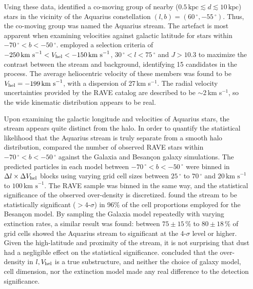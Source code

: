 \documentclass{emulateapj}
\begin{document}
Using these data, \citet{williams;et-al_2011} identified a co-moving group of nearby ($0.5\,\mbox{kpc} \lesssim d \lesssim 10\,\mbox{kpc}$) stars in the vicinity of the Aquarius constellation $(l, b) = (60\,^\circ, -55\,^\circ)$. Thus, the co-moving group was named the Aquarius stream. The artefact is most apparent when examining velocities against galactic latitude for stars within $-70\,^\circ < b < -50\,^\circ$. \citet{williams;et-al_2011} employed a selection criteria of $-250\,\mbox{km s}^{-1} < V_{\rm hel} < -150\,\mbox{km s}^{-1}$, $30\,^\circ < l < 75\,^\circ$ and $J > 10.3$ to maximize the contrast between the stream and background, identifying 15 candidates in the process. The average heliocentric velocity of these members was found to be $V_{\rm hel} = -199\,\mbox{km s}^{-1}$, with a dispersion of 27\,km s$^{-1}$. The radial velocity uncertainties provided by the RAVE catalog are described to be $\sim$2\,km s$^{-1}$, so the wide kinematic distribution appears to be real.

Upon examining the galactic longitude and velocities of Aquarius stars, the stream appears quite distinct from the halo. In order to quantify the statistical likelihood that the Aquarius stream is truly separate from a smooth halo distribution, \citet{williams;et-al_2011} compared the number of observed RAVE stars within $-70\,^\circ < b < -50\,^\circ$ against the Galaxia \citep{sharma;et-al_2011} and Besan\c{c}on \citep{robin;et-al_2003} galaxy simulations. The predicted particles in each model between $-70\,^\circ < b < -50\,^\circ$ were binned in $\Delta{l} \times \Delta{V_{\rm hel}}$ blocks using varying grid cell sizes between $25\,^\circ$ to $70\,^\circ$ and $20\,\mbox{km s}^{-1}$ to $100\,\mbox{km s}^{-1}$. The RAVE sample was binned in the same way, and the statistical significance of the observed over-density is discretized. \citet{williams;et-al_2011} found the stream to be statistically significant ($>$4-$\sigma$) in 96\% of the cell proportions employed for the Besan\c{c}on model. By sampling the Galaxia model repeatedly with varying extinction rates, a similar result was found: between $75\pm15$\,\% to $80\pm18$\,\% of grid cells showed the Aquarius stream to significant at the 4-$\sigma$ level or higher. Given the high-latitude and proximity of the stream, it is not surprising that dust had a negligible effect on the statistical significance. \citet{williams;et-al_2011} concluded that the over-density in $l, V_{\rm hel}$ is a true substructure, and neither the choice of galaxy model, cell dimension, nor the extinction model made any real difference to the detection significance.
\end{document}
